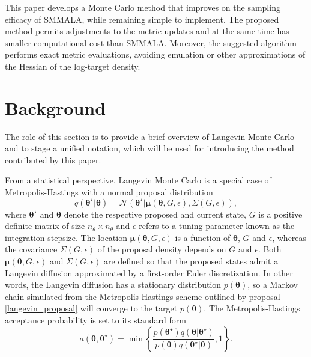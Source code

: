 \documentclass[twoside,11pt]{article}
\begin{document}
This paper develops a Monte Carlo method that improves on the sampling efficacy of SMMALA, while remaining simple to 
implement. The proposed method permits adjustments to the metric updates and at the same time has smaller computational cost 
than SMMALA. Moreover, the suggested algorithm performs exact metric evaluations, avoiding emulation or other approximations 
of the Hessian of the log-target density.

\section{Background}

The role of this section is to provide a brief overview of Langevin Monte Carlo and to stage a unified notation, which will
be used for introducing the method contributed by this paper.

From a statistical perspective, Langevin Monte Carlo is a special case of Metropolis-Hastings with a normal proposal
distribution
\begin{equation}
\label{langevin_proposal}
q(\boldsymbol{\theta}^{\star}|\boldsymbol{\theta}) =
\mathcal{N}(\boldsymbol{\theta}^{\star}|\boldsymbol{\mu}(\boldsymbol{\theta}, G, \epsilon), \Sigma(G, \epsilon)),
\end{equation}
where $\boldsymbol{\theta}^{\star}$ and $\boldsymbol{\theta}$ denote the respective proposed and current state, $G$ is a
positive definite matrix of size $n_{\theta} \times n_{\theta}$ and $\epsilon$ refers to a tuning parameter known as the
integration stepsize. The location $\boldsymbol{\mu}(\boldsymbol{\theta}, G, \epsilon)$ is a function of 
$\boldsymbol{\theta}$, $G$ and $\epsilon$, whereas the covariance $\Sigma(G, \epsilon)$ of the proposal density depends on 
$G$ and $\epsilon$. Both $\boldsymbol{\mu}(\boldsymbol{\theta}, G, \epsilon)$ and $\Sigma(G, \epsilon)$ are defined so that 
the proposed states admit a Langevin diffusion approximated by a first-order Euler discretization. In other words, the 
Langevin diffusion has a stationary distribution $p(\boldsymbol{\theta})$, so a Markov chain simulated from the 
Metropolis-Hastings scheme outlined by proposal \eqref{langevin_proposal} will converge to the target 
$p(\boldsymbol{\theta})$. The Metropolis-Hastings acceptance probability is set to its standard form
\begin{equation}
\label{langevin_acceptance}
a(\boldsymbol{\theta},\boldsymbol{\theta}^{\star}) =
\min\left\{
\frac{p(\boldsymbol{\theta}^{\star})q(\boldsymbol{\theta}|\boldsymbol{\theta}^{\star})}
{p(\boldsymbol{\theta})q(\boldsymbol{\theta}^{\star}|\boldsymbol{\theta})}
, 1
\right\}.
\end{equation}
\end{document}
